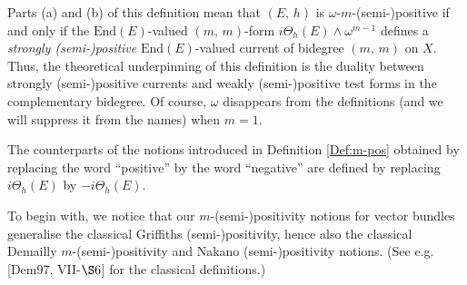 \documentclass[12pt]{article}
\begin{document}
Parts (a) and (b) of this definition mean that $(E,\,h)$ is $\omega$-$m$-(semi-)positive if and only if the $\mbox{End} (E)$-valued $(m,\,m)$-form $i\Theta_h(E)\wedge\omega^{m-1}$ defines a {\it strongly (semi-)positive} $\mbox{End} (E)$-valued current of bidegree $(m,\,m)$ on $X$. Thus, the theoretical underpinning of this definition is the duality between strongly (semi-)positive currents and weakly (semi-)positive test forms in the complementary bidegree. Of course, $\omega$ disappears from the definitions (and we will suppress it from the names) when $m=1$.

The counterparts of the notions introduced in Definition \ref{Def:m-pos} obtained by replacing the word ``positive'' by the word ``negative'' are defined by replacing $i\Theta_h(E)$ by $-i\Theta_h(E)$. 

\vspace{1ex}

To begin with, we notice that our $m$-(semi-)positivity notions for vector bundles generalise the classical Griffiths (semi-)positivity, hence also the classical Demailly $m$-(semi-)positivity and Nakano (semi-)positivity notions. (See e.g. [Dem97, VII-$\S6$] for the classical definitions.)
\end{document}

